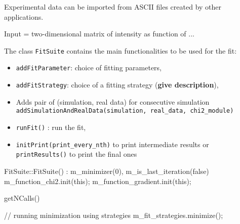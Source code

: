 Experimental data can be imported from ASCII files created by other applications.

Input = two-dimensional matrix of intensity as function of ...

The class \texttt{FitSuite} contains the main functionalities to be used
for the fit:
\begin{itemize}
\item \texttt{addFitParameter}: choice of fitting parameters, 
\item \texttt{addFitStrategy}: choice of a fitting strategy
  (\textbf{give description}),  
\item Adds pair of (simulation, real data) for consecutive simulation
\texttt{addSimulationAndRealData(simulation, real\_data, chi2\_module)}
\item \texttt{runFit()} : run the fit,
\item  \texttt{initPrint(print\_every\_nth)} to print intermediate
  results or \texttt{printResults()} to print the final ones
\end{itemize}

FitSuite::FitSuite() : m\_minimizer(0), m\_is\_last\_iteration(false)
    m\_function\_chi2.init(this);
    m\_function\_gradient.init(this);
   
getNCalls() 

    // running minimization using strategies
    m\_fit\_strategies.minimize();


